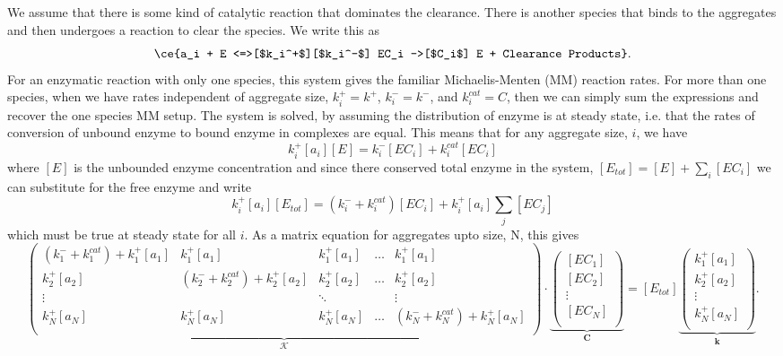 We assume that there is some kind of catalytic reaction that dominates the clearance. There is another species that binds to the aggregates and then undergoes a reaction to clear the species. We write this as
\begin{equation}
        \ce{a_i + E <=>[$k_i^+$][$k_i^-$] EC_i ->[$C_i$] E + Clearance Products}. \label{eq:MM}
\end{equation}
For an enzymatic reaction with only one species, this system gives the familiar Michaelis-Menten (MM) reaction rates. For more than one species, when we have rates independent of aggregate size, $k_i^+ = k^+$, $k_i^- = k^-$, and $k^{cat}_i = C$, then we can simply sum the expressions and recover the one species MM setup. The system is solved, by assuming the distribution of enzyme is at steady state, i.e. that the rates of conversion of unbound enzyme to bound enzyme in complexes are equal. This means that for any aggregate size, $i$, we have
\begin{equation}
    k_i^+[a_i][E] = k_i^-[EC_i]+k^{cat}_i[EC_i]
\end{equation}
where $[E]$ is the unbounded enzyme concentration and since there conserved total enzyme in the system, $[E_{tot}]=[E] + \sum_i [EC_i]$ we can substitute for the free enzyme and write
\begin{equation}
    k_i^+[a_i][E_{tot}] = (k_i^-+k^{cat}_i)[EC_i]+k_i^+[a_i]\sum_j[EC_j]
\end{equation}
which must be true at steady state for all $i$. As a matrix equation for aggregates upto size, N, this gives
\begin{equation}
    \underbrace{
    \begin{pmatrix}
    (k_1^-+k^{cat}_1)+k_1^+[a_1] & k_1^+[a_1] & k_1^+[a_1] & \hdots & k_1^+[a_1]\\
    k_2^+[a_2] & (k_2^-+k^{cat}_2)+k_2^+[a_2] & k_2^+[a_2] & \hdots & k_2^+[a_2]\\
    \vdots &   & \ddots &  & \vdots \\
    k_N^+[a_N] & k_N^+[a_N] & k_N^+[a_N] & \hdots & (k_N^-+k^{cat}_N)+k_N^+[a_N]\\
    \end{pmatrix}
    }_{\mathcal{K}}
    \cdot
    \underbrace{
    \begin{pmatrix}
    [EC_1]\\
    [EC_2]\\
    \vdots\\
    [EC_N]\\
    \end{pmatrix}
    }_{\mathbf{C}}
    =
    [E_{tot}]
    \underbrace{
    \begin{pmatrix}
    k_1^+[a_1]\\
    k_2^+[a_2]\\
    \vdots\\
    k_N^+[a_N]\\
    \end{pmatrix}
    }_{\mathbf{k}}.
\end{equation}
